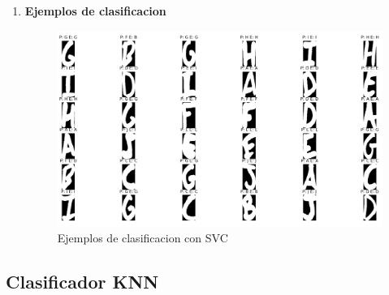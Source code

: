 \documentclass[8pt,a4paper]{article}
\begin{document}
\begin{enumerate}
\item \textbf{Ejemplos de clasificacion}

\begin{figure}[htbp]
\centering
    \includegraphics[scale=0.15]{./SVC100_50.png}
    \caption{Ejemplos de clasificacion con SVC}
\end{figure}
\end{enumerate}



\subsection{Clasificador KNN}
\end{document}
